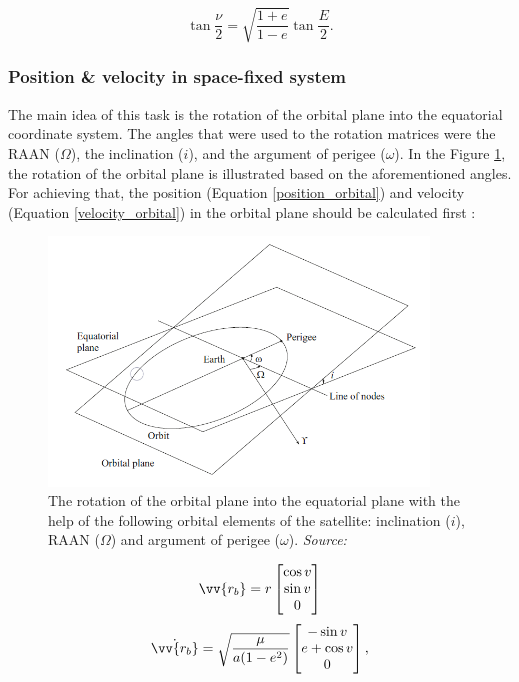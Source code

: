 \begin{equation}
\tan{\frac{\nu}{2}} = \sqrt{\frac{1 + e}{1 - e}} \tan{\frac{E}{2}}.
\end{equation}

\bigskip
\subsubsection{Position \& velocity in space-fixed system}
\bigskip

The main idea of this task is the rotation of the orbital plane into the equatorial coordinate system. The angles that were used to the rotation matrices were the RAAN ($\Omega$), the inclination ($i$), and the argument of perigee ($\omega$). In the Figure \ref{orbit_to_space}, the rotation of the orbital plane is illustrated based on the aforementioned angles. For achieving that, the position (Equation \ref{position_orbital}) and velocity (Equation \ref{velocity_orbital}) in the orbital plane should be calculated first \cite{Montenbruck}:

\begin{figure}
\centering
\includegraphics[width=0.9\textwidth]{Images/orbit_to_space.png}\caption{The rotation of the orbital plane into the equatorial plane with the help of the following orbital elements of the satellite: inclination ($i$), RAAN ($\Omega$) and argument of perigee ($\omega$). \textit{Source: \cite{Montenbruck}}}
\label{orbit_to_space} 
\end{figure}

\begin{equation}
\label{position_orbital}
\vv{r_{b}} = r \begin{bmatrix} \cos{v} \\ \sin{v} \\ 0 \end{bmatrix}
\end{equation}
\begin{equation}
\label{velocity_orbital}
\dot{\vv{r_{b}}} = \sqrt{\frac{\mu}{a (1 - e^2)}} \begin{bmatrix} -\sin{v} \\ e + \cos{v} \\ 0 \end{bmatrix},
\end{equation}

